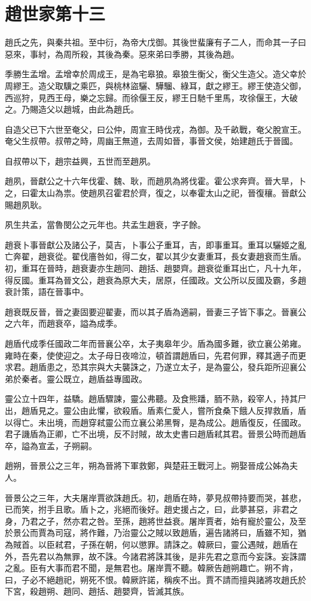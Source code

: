 \chapter{趙世家第十三}

趙氏之先，與秦共祖。至中衍，為帝大戊御。其後世蜚廉有子二人，而命其一子曰惡來，事紂，為周所殺，其後為秦。惡來弟曰季勝，其後為趙。

季勝生孟增。孟增幸於周成王，是為宅皋狼。皋狼生衡父，衡父生造父。造父幸於周繆王。造父取驥之乘匹，與桃林盜驪、驊騮、綠耳，獻之繆王。繆王使造父御，西巡狩，見西王母，樂之忘歸。而徐偃王反，繆王日馳千里馬，攻徐偃王，大破之。乃賜造父以趙城，由此為趙氏。

自造父已下六世至奄父，曰公仲，周宣王時伐戎，為御。及千畝戰，奄父脫宣王。奄父生叔帶。叔帶之時，周幽王無道，去周如晉，事晉文侯，始建趙氏于晉國。

自叔帶以下，趙宗益興，五世而至趙夙。

趙夙，晉獻公之十六年伐霍、魏、耿，而趙夙為將伐霍。霍公求奔齊。晉大旱，卜之，曰霍太山為祟。使趙夙召霍君於齊，復之，以奉霍太山之祀，晉復穰。晉獻公賜趙夙耿。

夙生共孟，當魯閔公之元年也。共孟生趙衰，字子餘。

趙衰卜事晉獻公及諸公子，莫吉，卜事公子重耳，吉，即事重耳。重耳以驪姬之亂亡奔翟，趙衰從。翟伐廧咎如，得二女，翟以其少女妻重耳，長女妻趙衰而生盾。初，重耳在晉時，趙衰妻亦生趙同、趙括、趙嬰齊。趙衰從重耳出亡，凡十九年，得反國。重耳為晉文公，趙衰為原大夫，居原，任國政。文公所以反國及霸，多趙衰計策，語在晉事中。

趙衰既反晉，晉之妻固要迎翟妻，而以其子盾為適嗣，晉妻三子皆下事之。晉襄公之六年，而趙衰卒，謚為成季。

趙盾代成季任國政二年而晉襄公卒，太子夷皋年少。盾為國多難，欲立襄公弟雍。雍時在秦，使使迎之。太子母日夜啼泣，頓首謂趙盾曰，先君何罪，釋其適子而更求君。趙盾患之，恐其宗與大夫襲誅之，乃遂立太子，是為靈公，發兵距所迎襄公弟於秦者。靈公既立，趙盾益專國政。

靈公立十四年，益驕。趙盾驟諫，靈公弗聽。及食熊蹯，胹不熟，殺宰人，持其尸出，趙盾見之。靈公由此懼，欲殺盾。盾素仁愛人，嘗所食桑下餓人反捍救盾，盾以得亡。未出境，而趙穿弒靈公而立襄公弟黑臀，是為成公。趙盾復反，任國政。君子譏盾為正卿，亡不出境，反不討賊，故太史書曰趙盾弒其君。晉景公時而趙盾卒，謚為宣孟，子朔嗣。

趙朔，晉景公之三年，朔為晉將下軍救鄭，與楚莊王戰河上。朔娶晉成公姊為夫人。

晉景公之三年，大夫屠岸賈欲誅趙氏。初，趙盾在時，夢見叔帶持要而哭，甚悲，已而笑，拊手且歌。盾卜之，兆絕而後好。趙史援占之，曰，此夢甚惡，非君之身，乃君之子，然亦君之咎。至孫，趙將世益衰。屠岸賈者，始有寵於靈公，及至於景公而賈為司寇，將作難，乃治靈公之賊以致趙盾，遍告諸將曰，盾雖不知，猶為賊首。以臣弒君，子孫在朝，何以懲罪。請誅之。韓厥曰，靈公遇賊，趙盾在外，吾先君以為無罪，故不誅。今諸君將誅其後，是非先君之意而今妄誅。妄誅謂之亂。臣有大事而君不聞，是無君也。屠岸賈不聽。韓厥告趙朔趣亡。朔不肯，曰，子必不絕趙祀，朔死不恨。韓厥許諾，稱疾不出。賈不請而擅與諸將攻趙氏於下宮，殺趙朔、趙同、趙括、趙嬰齊，皆滅其族。

